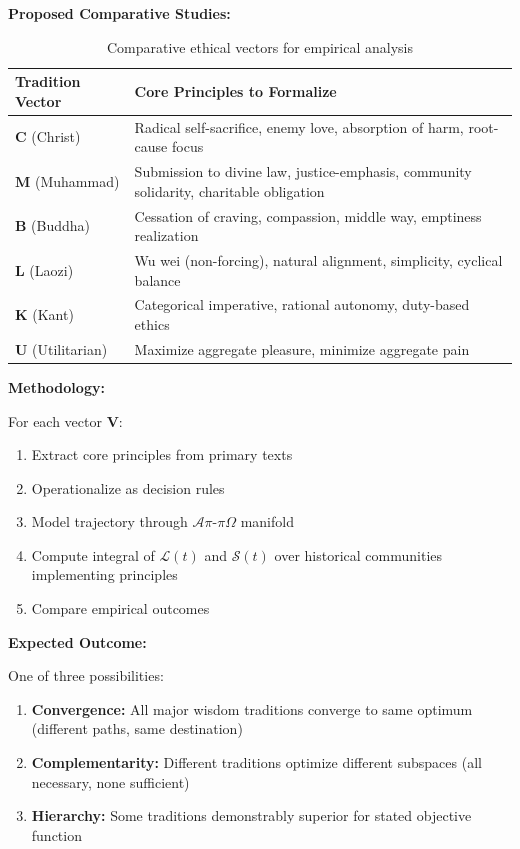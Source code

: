 \documentclass[11pt,a4paper]{article}
\theoremstyle{definition}
\theoremstyle{remark}
\begin{document}
\begin{small}
\textbf{Proposed Comparative Studies:}

\begin{table}[h]
\centering
\small
\begin{tabular}{|l|p{7cm}|}
\hline
\textbf{Tradition Vector} & \textbf{Core Principles to Formalize} \\
\hline
$\mathbf{C}$ (Christ) & Radical self-sacrifice, enemy love, absorption of harm, root-cause focus \\
\hline
$\mathbf{M}$ (Muhammad) & Submission to divine law, justice-emphasis, community solidarity, charitable obligation \\
\hline
$\mathbf{B}$ (Buddha) & Cessation of craving, compassion, middle way, emptiness realization \\
\hline
$\mathbf{L}$ (Laozi) & Wu wei (non-forcing), natural alignment, simplicity, cyclical balance \\
\hline
$\mathbf{K}$ (Kant) & Categorical imperative, rational autonomy, duty-based ethics \\
\hline
$\mathbf{U}$ (Utilitarian) & Maximize aggregate pleasure, minimize aggregate pain \\
\hline
\end{tabular}
\caption{Comparative ethical vectors for empirical analysis}
\end{table}

\textbf{Methodology:}

For each vector $\mathbf{V}$:
\begin{enumerate}
\item Extract core principles from primary texts
\item Operationalize as decision rules
\item Model trajectory through $\mathcal{A}\pi\text{-}\pi\Omega$ manifold
\item Compute integral of $\mathcal{L}(t)$ and $\mathcal{S}(t)$ over historical communities implementing principles
\item Compare empirical outcomes
\end{enumerate}

\textbf{Expected Outcome:}

One of three possibilities:
\begin{enumerate}
\item \textbf{Convergence:} All major wisdom traditions converge to same optimum (different paths, same destination)
\item \textbf{Complementarity:} Different traditions optimize different subspaces (all necessary, none sufficient)
\item \textbf{Hierarchy:} Some traditions demonstrably superior for stated objective function
\end{enumerate}


\end{small}
\end{document}
